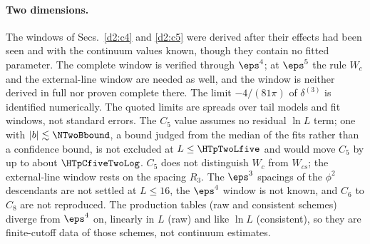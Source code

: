 \paragraph{Two dimensions.}\label{d2:caveats}
The windows of Secs.~\ref{d2:c4} and \ref{d2:c5} were derived after their effects had been seen and with the continuum values
known, though they contain no fitted parameter. The complete window is verified through $\eps^4$; at $\eps^5$ the rule $W_c$
and the external-line window are needed as well, and the window is neither derived in full nor proven complete there. The limit
$-4/(81\pi)$ of $\delta^{(3)}$ is identified numerically. The quoted limits are spreads over tail models and fit windows, not
standard errors. The $C_5$ value assumes no residual $\ln L$ term; one with $|b|\lesssim\NTwoBbound$, a bound judged from the
median of the fits rather than a confidence bound, is not excluded at $L\le\HTpTwoLfive$ and would move $C_5$ by up to about
$\HTpCfiveTwoLog$. $C_5$ does not distinguish $W_c$ from $W_{cs}$; the external-line window rests on the spacing $R_3$. The $\eps^3$ spacings of the $\phi^2$ descendants are not settled at $L\le16$, the $\eps^4$
window is not known, and $C_6$ to $C_8$ are not reproduced. The production tables (raw and consistent schemes) diverge from
$\eps^4$ on, linearly in $L$ (raw) and like $\ln L$ (consistent), so they are finite-cutoff data of those schemes, not continuum
estimates.
